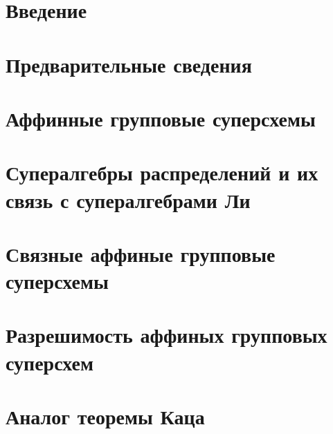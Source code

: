 \documentclass[a4paper,12pt]{article}
\begin{document}
  
  \setcounter{page}{2}

  \section*{Введение}
    
  
  \newpage

  \tableofcontents

  \newpage
  \section{Предварительные сведения}
    

  \newpage
  \section{Аффинные групповые суперсхемы}
    

  \newpage
  \section{Супералгебры распределений и их связь с супералгебрами Ли}
    

  \newpage
  \section{Связные аффиные групповые суперсхемы}
    

  \newpage
  \section{Разрешимость аффиных групповых суперсхем}
    

  \newpage
  \section{Аналог теоремы Каца}
    
 

  \newpage
  
\end{document}
